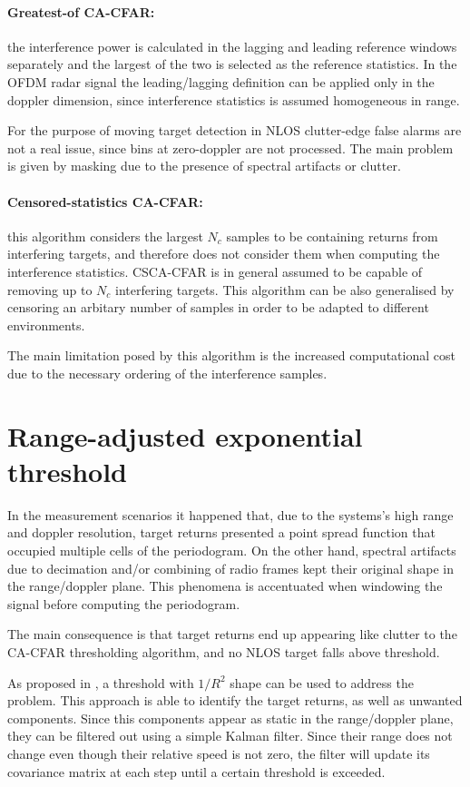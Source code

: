 \paragraph{Greatest-of CA-CFAR:}
the interference power is calculated in the lagging and leading reference windows separately and the largest of the two is selected as the reference statistics. In the OFDM radar signal the leading/lagging definition can be applied only in the doppler dimension, since interference statistics is assumed homogeneous in range.

For the purpose of moving target detection in NLOS clutter-edge false alarms are not a real issue, since bins at zero-doppler are not processed.
 The main problem is given by masking due to the presence of spectral artifacts or clutter.
 
 
\paragraph{Censored-statistics CA-CFAR:}
this algorithm considers the largest $N_c$ samples to be containing returns from interfering targets, and therefore does not consider them when computing the interference statistics. CSCA-CFAR is in general assumed to be capable of removing up to $N_c$ interfering targets.
This algorithm can be also generalised by censoring an arbitary number of samples in order to be adapted to different environments. 

The main limitation posed by this algorithm is the increased computational cost due to the necessary ordering of the interference samples.


\section{Range-adjusted exponential threshold}

In the measurement scenarios it happened that, due to the systems's high range and doppler resolution, target returns presented a point spread function that occupied multiple cells of the periodogram. On the other hand, spectral artifacts due to decimation and/or combining of radio frames kept their original shape in the range/doppler plane. This phenomena is accentuated when windowing the signal before computing the periodogram.

The main consequence is that target returns end up appearing like clutter to the CA-CFAR thresholding algorithm, and no NLOS target falls above threshold.

As proposed in \cite{Wagner_Feger_Stelzer_2017}, a threshold with $1/R^2$ shape can be used to address the problem. This approach is able to identify the target returns, as well as unwanted components. Since this components appear as static in the range/doppler plane, they can be filtered out using a simple Kalman filter. Since their range does not change even though their relative speed is not zero, the filter will update its covariance matrix at each step until a certain threshold is exceeded.





